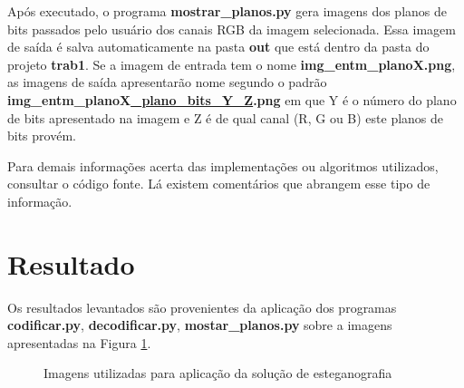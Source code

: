 \documentclass{article}
\begin{document}
\noindent
Após executado, o programa \textbf{mostrar\_planos.py} gera imagens dos planos de bits passados pelo usuário dos canais RGB da imagem selecionada. Essa imagem de saída é salva automaticamente na pasta \textbf{out} que está dentro da pasta do projeto \textbf{trab1}. Se a imagem de entrada tem o nome \textbf{img\_entm\_planoX.png}, as imagens de saída apresentarão nome segundo o padrão \textbf{img\_entm\_planoX\underline{\_plano\_bits\_Y\_Z}.png} em que Y é o número do plano de bits apresentado na imagem e Z é de qual canal (R, G ou B) este planos de bits provém.

Para demais informações acerta das implementações ou algoritmos utilizados, consultar o código fonte. Lá existem comentários que abrangem esse tipo de informação.

%
\section{Resultado}
Os resultados levantados são provenientes da aplicação dos programas \textbf{codificar.py}, \textbf{decodificar.py}, \textbf{mostar\_planos.py} sobre a imagens apresentadas na Figura \ref{fig:imagem:entrada}. 

\begin{figure}[htp]%
	\centering
	\qquad
	\caption{Imagens utilizadas para aplicação da solução de esteganografia}%
	\label{fig:imagem:entrada}%
\end{figure}
\end{document}
